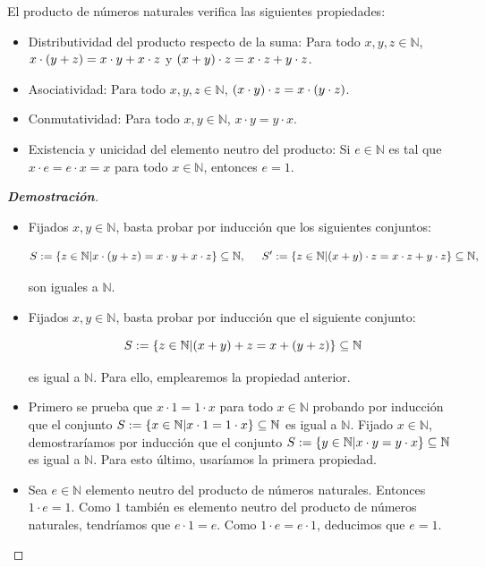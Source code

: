 \begin{proposition}
  \rm El producto de números naturales verifica las siguientes propiedades:

  \begin{itemize}
    \item[1.] Distributividad del producto respecto de la suma: Para todo $x,y,z\in\mathbb{N}$, $x\cdot\left(y+z\right)=x\cdot y+x\cdot z$ y $\left(x+y\right)\cdot z=x\cdot z+y\cdot z$.
    \item[2.] Asociatividad: Para todo $x,y,z\in\mathbb{N}$, $\left(x\cdot y\right)\cdot z=x\cdot\left(y\cdot z\right)$.
    \item[3.] Conmutatividad: Para todo $x,y\in\mathbb{N}$, $x\cdot y=y\cdot x$.
    \item[4.] Existencia y unicidad del elemento neutro del producto: Si $e\in\mathbb{N}$ es tal que $x\cdot e=e\cdot x=x$ para todo $x\in\mathbb{N}$, entonces $e=1$. 
  \end{itemize}
  \begin{proof}[\rm\textbf{Demostración}]
    \hfill
    \begin{itemize}
      \item[1.] Fijados $x,y\in\mathbb{N}$, basta probar por inducción que los siguientes conjuntos:
      
      \begin{equation}
        S:=\left\{z\in\mathbb{N}\middle|x\cdot\left(y+z\right)=x\cdot y+x\cdot z\right\}\subseteq\mathbb{N},\hspace{0.5cm}S':=\left\{z\in\mathbb{N}\middle|\left(x+y\right)\cdot z=x\cdot z+y\cdot z\right\}\subseteq\mathbb{N},
      \end{equation}

      son iguales a $\mathbb{N}$.

      \item[2.] Fijados $x,y\in\mathbb{N}$, basta probar por inducción que el siguiente conjunto:
      
      \begin{equation}
        S:=\left\{z\in\mathbb{N}\middle|\left(x+y\right)+z=x+\left(y+z\right)\right\}\subseteq\mathbb{N}
      \end{equation}
      
      es igual a $\mathbb{N}$. Para ello, emplearemos la propiedad anterior.
      \item[3.] Primero se prueba que $x\cdot 1=1\cdot x$ para todo $x\in\mathbb{N}$ probando por inducción que el conjunto $S:=\left\{x\in\mathbb{N}\middle|x\cdot 1=1\cdot x\right\}\subseteq\mathbb{N}$ es igual a $\mathbb{N}$. Fijado $x\in\mathbb{N}$, demostraríamos por inducción que el conjunto $S:=\left\{y\in\mathbb{N}\middle|x\cdot y=y\cdot x\right\}\subseteq\mathbb{N}$ es igual a $\mathbb{N}$. Para esto último, usaríamos la primera propiedad.
      \item[4.] Sea $e\in\mathbb{N}$ elemento neutro del producto de números naturales. Entonces $1\cdot e=1$. Como $1$ también es elemento neutro del producto de números naturales, tendríamos que $e\cdot 1=e$. Como $1\cdot e=e\cdot 1$, deducimos que $e=1$. 
    \end{itemize}
  \end{proof}
\end{proposition}
